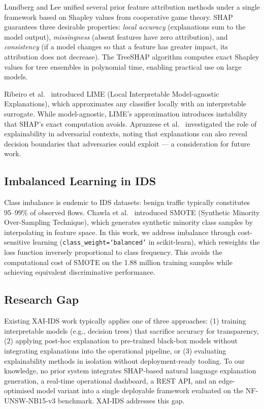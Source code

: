 \documentclass[12pt,a4paper]{article}
\begin{document}
Lundberg and Lee \cite{lundberg2017shap} unified several prior feature attribution
methods under a single framework based on Shapley values from cooperative game theory.
SHAP guarantees three desirable properties: \emph{local accuracy} (explanations
sum to the model output), \emph{missingness} (absent features have zero attribution),
and \emph{consistency} (if a model changes so that a feature has greater impact,
its attribution does not decrease). The TreeSHAP algorithm \cite{lundberg2017shap}
computes exact Shapley values for tree ensembles in polynomial time, enabling
practical use on large models.

Ribeiro et al.\ \cite{ribeiro2016lime} introduced LIME (Local Interpretable
Model-agnostic Explanations), which approximates any classifier locally with an
interpretable surrogate. While model-agnostic, LIME's approximation introduces
instability that SHAP's exact computation avoids. Apruzzese et al.\
\cite{apruzzese2022xai} investigated the role of explainability in adversarial
contexts, noting that explanations can also reveal decision boundaries that
adversaries could exploit — a consideration for future work.

\subsection{Imbalanced Learning in IDS}

Class imbalance is endemic to IDS datasets: benign traffic typically constitutes
95--99\% of observed flows. Chawla et al.\ \cite{chawla2002smote} introduced SMOTE
(Synthetic Minority Over-Sampling Technique), which generates synthetic minority
class samples by interpolating in feature space. In this work, we address imbalance
through cost-sensitive learning (\texttt{class\_weight=`balanced'} in scikit-learn),
which reweights the loss function inversely proportional to class frequency. This
avoids the computational cost of SMOTE on the 1.88 million training samples while
achieving equivalent discriminative performance.

\subsection{Research Gap}

Existing XAI-IDS work typically applies one of three approaches: (1) training
interpretable models (e.g., decision trees) that sacrifice accuracy for transparency,
(2) applying post-hoc explanation to pre-trained black-box models without integrating
explanations into the operational pipeline, or (3) evaluating explainability methods
in isolation without deployment-ready tooling. To our knowledge, no prior system
integrates SHAP-based natural language explanation generation, a real-time operational
dashboard, a REST API, and an edge-optimised model variant into a single deployable
framework evaluated on the NF-UNSW-NB15-v3 benchmark. XAI-IDS addresses this gap.
\end{document}
